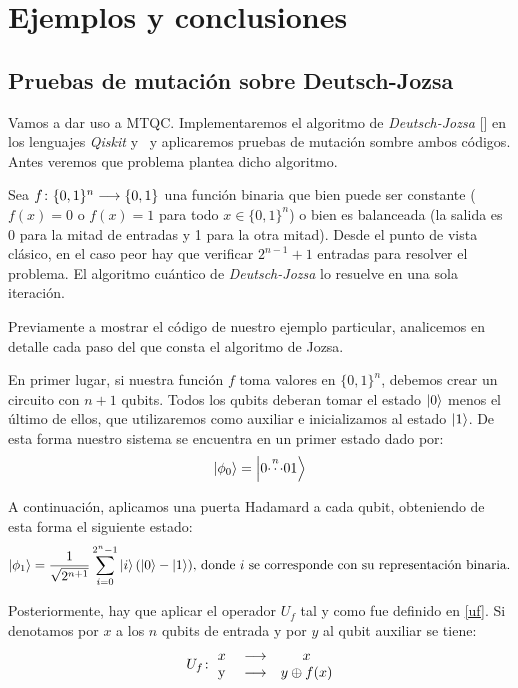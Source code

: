 \chapter{Ejemplos y conclusiones}

\section{Pruebas de mutación sobre Deutsch-Jozsa}

Vamos a dar uso a MTQC. Implementaremos el algoritmo de \textit{Deutsch-Jozsa} [\cite{deutsch1992rapid}] en los lenguajes \textit{Qiskit} y \qsh\ y aplicaremos pruebas de mutación sombre ambos códigos. Antes veremos que problema plantea dicho algoritmo.

Sea $f\colon \{0,1\}^n\longrightarrow \{0,1\}$ una función binaria que bien puede ser constante ($f(x) = 0$ o $f(x) = 1$ para todo $x\in\{0,1\}^n$) o bien es balanceada (la salida es 0 para la mitad de entradas y 1 para la otra mitad). Desde el punto de vista clásico, en el caso peor hay que verificar $2^{n-1}+1$ entradas para resolver el problema. El algoritmo cuántico de \textit{Deutsch-Jozsa} lo resuelve en una sola iteración.

Previamente a mostrar el código de nuestro ejemplo particular, analicemos en detalle cada paso del que consta el algoritmo de Jozsa.

En primer lugar, si nuestra función $f$ toma valores en $\{0,1\}^n$, debemos crear un circuito con $n + 1$ qubits. Todos los qubits deberan tomar el estado $\left|0\right\rangle$ menos el último de ellos, que utilizaremos como auxiliar e inicializamos al estado $\left|1\right\rangle$. De esta forma nuestro sistema se encuentra en un primer estado dado por:
\begin{equation}
\left|\phi_0\right\rangle = \left|0\overset{n}{\cdots}01\right\rangle
\end{equation}

A continuación, aplicamos una puerta Hadamard a cada qubit, obteniendo de esta forma el siguiente estado:
\begin{equation}
\left|\phi_1\right\rangle = \dfrac{1}{\sqrt{2^{n+1}}} \sum\limits_{i=0}^{2^n - 1} \left|i\right\rangle(\left|0\right\rangle-\left|1\right\rangle) \textrm{, donde $i$ se corresponde con su representación binaria.}
\end{equation}

Posteriormente, hay que aplicar el operador $U_f$ tal y como fue definido en \ref{uf}. Si denotamos por $x$ a los $n$ qubits de entrada y por $y$ al qubit auxiliar se tiene:
\begin{equation}
U_f\colon \begin{matrix}x&\longrightarrow& x\\ \mathrm{\ y\ }&\longrightarrow& y\oplus f(x)\end{matrix}
\end{equation}

